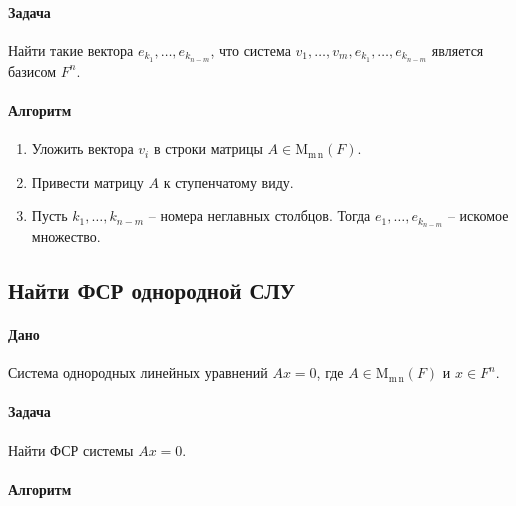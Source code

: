 \documentclass{article}
\newcommand{\MatrixDim}[3]{\operatorname{\mathrm{M}_{#2\,#3}}(#1)}
\begin{document}
\paragraph{Задача}

Найти такие вектора $e_{k_1},\ldots, e_{k_{n-m}}$, что система $v_1,\ldots,v_m,e_{k_1},\ldots,e_{k_{n-m}}$ является базисом $F^{n}$.

\paragraph{Алгоритм}

\begin{enumerate}
\item Уложить вектора $v_i$ в строки матрицы $A\in\MatrixDim{F}{m}{n}$.

\item Привести матрицу $A$ к ступенчатому виду.

\item Пусть $k_1,\ldots,k_{n-m}$ -- номера неглавных столбцов.
Тогда $e_1,\ldots,e_{k_{n-m}}$ -- искомое множество.
\end{enumerate}

\subsection{Найти ФСР однородной СЛУ}

\paragraph{Дано}

Система однородных линейных уравнений $Ax = 0$, где $A\in \MatrixDim{F}{m}{n}$ и $x\in F^{n}$.

\paragraph{Задача}

Найти ФСР системы $Ax = 0$.

\paragraph{Алгоритм}
\end{document}
